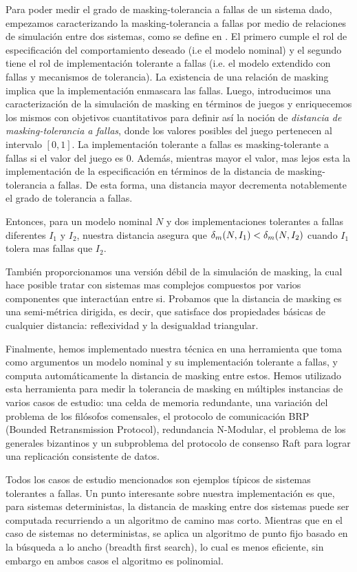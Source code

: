 Para poder medir el grado de masking-tolerancia a fallas de un sistema dado, empezamos caracterizando la masking-tolerancia a fallas por medio de relaciones de simulación entre dos sistemas, como se define en \cite{DemasiCMA17}. El primero cumple el rol de especificación del comportamiento deseado (i.e el modelo nominal) y el segundo tiene el rol de implementación tolerante a fallas (i.e. el modelo extendido con fallas y mecanismos de tolerancia).
La existencia de una relación de masking implica que la implementación enmascara las fallas. Luego, introducimos una caracterización de la simulación de masking en términos de juegos y enriquecemos los mismos con objetivos cuantitativos para definir así la noción de \emph{distancia de masking-tolerancia a fallas}, donde los valores posibles del juego pertenecen al intervalo  $[0,1]$. La implementación tolerante a fallas es masking-tolerante a fallas si el valor del juego es $0$. Además, mientras mayor el valor, mas lejos esta la implementación de la especificación en términos de la distancia de masking-tolerancia a fallas. De esta forma, una distancia mayor decrementa notablemente el grado de tolerancia a fallas.

Entonces, para un modelo nominal $N$ y dos implementaciones tolerantes a fallas diferentes $I_1$ y $I_2$, nuestra distancia asegura que  $\delta_{m}(N,I_1)<\delta_{m}(N,I_2)$ cuando $I_1$ tolera mas fallas que $I_2$.

También proporcionamos una versión débil de la simulación de masking, la cual hace posible tratar con sistemas mas complejos compuestos por varios componentes que interactúan entre si. Probamos que la distancia de masking es una semi-métrica dirigida, es decir, que satisface dos propiedades básicas de cualquier distancia: reflexividad y la desigualdad triangular.

Finalmente, hemos implementado nuestra técnica en una herramienta que toma como argumentos un modelo nominal y su implementación tolerante a fallas, y computa automáticamente la distancia de masking entre estos.
Hemos utilizado esta herramienta para medir la tolerancia de masking en múltiples instancias de varios casos de estudio: una celda de memoria redundante, una variación del problema de los filósofos comensales, el protocolo de comunicación BRP (Bounded Retransmission Protocol), redundancia N-Modular, el problema de los generales bizantinos y un subproblema del protocolo de consenso Raft para lograr una replicación consistente de datos.

Todos los casos de estudio mencionados son ejemplos típicos de sistemas tolerantes a fallas. Un punto interesante sobre nuestra implementación es que, para sistemas deterministas, la distancia de masking entre dos sistemas puede ser computada recurriendo a un algoritmo de camino mas corto. Mientras que en el caso de sistemas no deterministas, se aplica un algoritmo de punto fijo basado en la búsqueda a lo ancho (breadth first search), lo cual es menos eficiente, sin embargo en ambos casos el algoritmo es polinomial.


